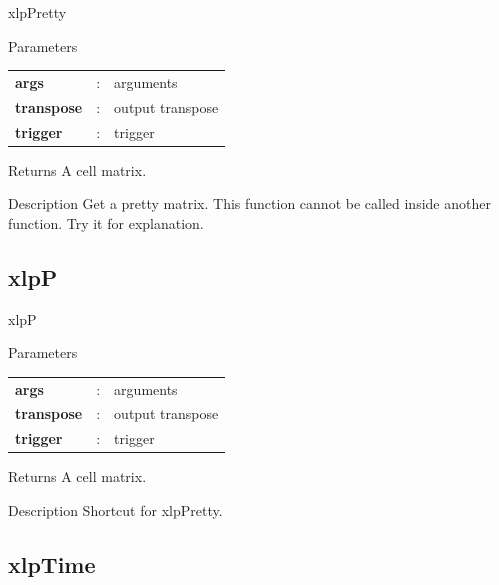 \begin{xlpfunctitle}{xlpPretty}

\begin{xlpfunc}{Parameters}
\begin{tabular}{p{3.5cm}cl}
\textbf{args}& : & arguments \\
\textbf{transpose}& : & output transpose \\
\textbf{trigger}& : & trigger 
\end{tabular}
\end{xlpfunc}


\begin{xlpfunc}{Returns}
A cell matrix.
\end{xlpfunc}

\begin{xlpfunc}{Description}
Get a pretty matrix. This function cannot be called inside another \xlp function.
Try it for explanation.
\end{xlpfunc}
\end{xlpfunctitle}


\subsection{xlpP}

\begin{xlpfunctitle}{xlpP}

\begin{xlpfunc}{Parameters}
\begin{tabular}{p{3.5cm}cl}
\textbf{args}& : & arguments \\
\textbf{transpose}& : & output transpose \\
\textbf{trigger}& : & trigger 
\end{tabular}
\end{xlpfunc}


\begin{xlpfunc}{Returns}
A cell matrix.
\end{xlpfunc}

\begin{xlpfunc}{Description}
Shortcut for xlpPretty.
\end{xlpfunc}
\end{xlpfunctitle}

\subsection{xlpTime}

